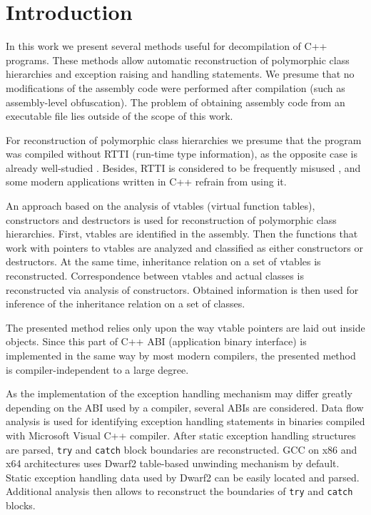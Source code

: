 \documentclass[times, 10pt,twocolumn]{article}
\renewcommand{\~}{{\raise.35ex\hbox{$\scriptstyle\sim$}}}
\begin{document}
\quad
\section{Introduction}
In this work we present several methods useful for decompilation
of C++ programs. These methods allow automatic reconstruction
of polymorphic class hierarchies and exception raising and
handling statements.
We presume
that no modifications of the assembly code were performed
after compilation (such as assembly-level obfuscation).
The problem of obtaining assembly code from an executable file
lies outside of the scope of this work.

For reconstruction of polymorphic class hierarchies we presume
that the program was compiled without RTTI (run-time type
information), as the opposite case is already well-studied \cite{fokin10, sabanal07, skochinsky06c}.
Besides, RTTI is considered to be frequently misused
\cite{stroustrup93}, and some modern applications written
in C++ refrain from using it.

An approach based on the analysis of vtables (virtual function tables),
constructors and destructors is used for reconstruction of
polymorphic class hierarchies. First, vtables are identified in the assembly.
Then the functions that work with pointers to vtables
are analyzed and classified as either constructors or destructors.
At the same time, inheritance relation on a set of vtables is reconstructed.
Correspondence between vtables and actual
classes is reconstructed via analysis of constructors.
Obtained information is then used for inference of the inheritance
relation on a set of classes.


The presented method relies only upon the way vtable pointers are laid out
inside objects. Since this part of C++ ABI (application binary interface)
is implemented in the same way by most modern compilers, the presented method is
compiler-independent to a large degree.

As the implementation of the exception handling mechanism may differ greatly
depending on the ABI used by a compiler, several ABIs are considered.
Data flow analysis is used for identifying exception handling
statements in binaries compiled with Microsoft Visual C++ compiler.
After static exception handling structures are parsed, \lstinline{try} and
\lstinline{catch} block boundaries are reconstructed.
GCC on x86 and x64 architectures uses Dwarf2
table-based unwinding mechanism by default. Static exception handling
data used by Dwarf2 can be easily located and parsed. Additional
analysis then allows to reconstruct the boundaries of \lstinline{try} and \lstinline{catch} blocks.
\end{document}
